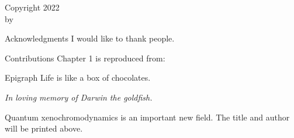
\ShowTitle

\begin{FrontCopyright}
\large
Copyright 2022\\[\bigskipamount] by\\[\bigskipamount] \GetAuthors
\end{FrontCopyright}

\begin{FrontChapter}{Acknowledgments}
I would like to thank people.
\end{FrontChapter}

\begin{FrontChapter}{Contributions}
Chapter 1 is reproduced from:\\[\smallskipamount]
\end{FrontChapter}

\begin{SpecialChapter}{Epigraph}
\large Life is like a box of chocolates.\\
\hrulefill
\end{SpecialChapter}

\begin{SpecialChapter}[Dedication]
\itshape In loving memory of Darwin the goldfish.
\end{SpecialChapter}

\begin{FrontAbstract}
Quantum xenochromodynamics is an important new field.
The title and author will be printed above.
\end{FrontAbstract}

\ShowTableOfContents
\ShowListOfFigures
\ShowListOfTables
\ShowListOfAbbrevs
